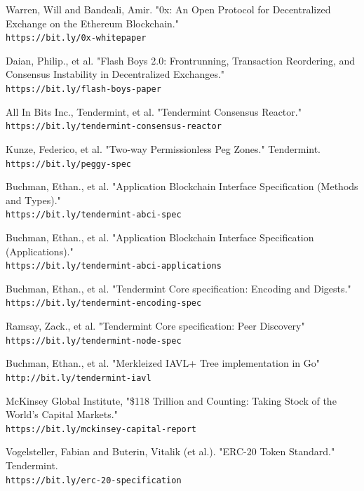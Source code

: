 \documentclass[10pt]{article}
\begin{document}
\begin{thebibliography}{9}

Warren, Will and Bandeali, Amir. "0x: An Open Protocol for Decentralized Exchange on the Ethereum Blockchain."
\\\texttt{https://bit.ly/0x-whitepaper}

Daian, Philip., et al. "Flash Boys 2.0: Frontrunning, Transaction Reordering, and Consensus Instability in Decentralized Exchanges."
\\\texttt{https://bit.ly/flash-boys-paper}

All In Bits Inc., Tendermint, et al. "Tendermint Consensus Reactor."
\\\texttt{https://bit.ly/tendermint-consensus-reactor}

Kunze, Federico, et al. "Two-way Permissionless Peg Zones." Tendermint.
\\\texttt{https://bit.ly/peggy-spec}

Buchman, Ethan., et al. "Application Blockchain Interface Specification (Methods and Types)."
\\\texttt{https://bit.ly/tendermint-abci-spec}

Buchman, Ethan., et al. "Application Blockchain Interface Specification (Applications)."
\\\texttt{https://bit.ly/tendermint-abci-applications}

Buchman, Ethan., et al. "Tendermint Core specification: Encoding and Digests."
\\\texttt{https://bit.ly/tendermint-encoding-spec}

Ramsay, Zack., et al. "Tendermint Core specification: Peer Discovery"
\\\texttt{https://bit.ly/tendermint-node-spec}

Buchman, Ethan., et al. "Merkleized IAVL+ Tree implementation in Go"
\\\texttt{http://bit.ly/tendermint-iavl}

McKinsey Global Institute, "\$118 Trillion and Counting: Taking Stock of the World's Capital Markets."
\\\texttt{https://bit.ly/mckinsey-capital-report}

Vogelsteller, Fabian and Buterin, Vitalik (et al.). "ERC-20 Token Standard." Tendermint.
\\\texttt{https://bit.ly/erc-20-specification}


\end{thebibliography}
\end{document}
